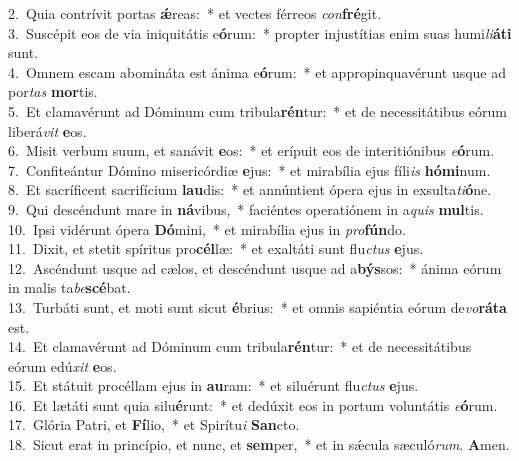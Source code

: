 {2.~}Quia contrívit portas \textbf{ǽ}reas:~* et vectes férreos \textit{con}\textbf{fré}git.\\
{3.~}Suscépit eos de via iniquitátis e\textbf{ó}rum:~* propter injustítias enim suas humi\textit{li}\textbf{á}\textbf{ti} sunt.\\
{4.~}Omnem escam abomináta est ánima e\textbf{ó}rum:~* et appropinquavérunt usque ad por\textit{tas} \textbf{mor}tis.\\
{5.~}Et clamavérunt ad Dóminum cum tribula\textbf{rén}tur:~* et de necessitátibus eórum liberá\textit{vit} \textbf{e}os.\\
{6.~}Misit verbum suum, et sanávit \textbf{e}os:~* et erípuit eos de interitiónibus \textit{e}\textbf{ó}rum.\\
{7.~}Confiteántur Dómino misericórdiæ \textbf{e}jus:~* et mirabília ejus fíli\textit{is} \textbf{hó}\textbf{mi}num.\\
{8.~}Et sacríficent sacrifícium \textbf{lau}dis:~* et annúntient ópera ejus in exsulta\textit{ti}\textbf{ó}ne.\\
{9.~}Qui descéndunt mare in \textbf{ná}vibus,~* faciéntes operatiónem in a\textit{quis} \textbf{mul}tis.\\
{10.~}Ipsi vidérunt ópera \textbf{Dó}mini,~* et mirabília ejus in \textit{pro}\textbf{fún}do.\\
{11.~}Dixit, et stetit spíritus pro\textbf{cél}læ:~* et exaltáti sunt flu\textit{ctus} \textbf{e}jus.\\
{12.~}Ascéndunt usque ad cælos, et descéndunt usque ad a\textbf{býs}sos:~* ánima eórum in malis ta\textit{be}\textbf{scé}bat.\\
{13.~}Turbáti sunt, et moti sunt sicut \textbf{é}brius:~* et omnis sapiéntia eórum de\textit{vo}\textbf{rá}\textbf{ta} est.\\
{14.~}Et clamavérunt ad Dóminum cum tribula\textbf{rén}tur:~* et de necessitátibus eórum edú\textit{xit} \textbf{e}os.\\
{15.~}Et státuit procéllam ejus in \textbf{au}ram:~* et siluérunt flu\textit{ctus} \textbf{e}jus.\\
{16.~}Et lætáti sunt quia silu\textbf{é}runt:~* et dedúxit eos in portum voluntátis \textit{e}\textbf{ó}rum.\\
{17.~}Glória Patri, et \textbf{Fí}lio,~* et Spirítu\textit{i} \textbf{San}cto.\\
{18.~}Sicut erat in princípio, et nunc, et \textbf{sem}per,~* et in sǽcula sæculó\textit{rum}. \textbf{A}men.\\
